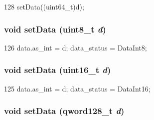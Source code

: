 \begin{DoxyCode}
128 { setData((uint64_t)d); }
\end{DoxyCode}
\hypertarget{classTrace_1_1InstRecord_aa51cc6b27f5c0f81c58f5735506cd5a7}{
\subsubsection[{setData}]{\setlength{\rightskip}{0pt plus 5cm}void setData (uint8\_\-t {\em d})}}
\label{classTrace_1_1InstRecord_aa51cc6b27f5c0f81c58f5735506cd5a7}



\begin{DoxyCode}
126 { data.as_int = d; data_status = DataInt8; }
\end{DoxyCode}
\hypertarget{classTrace_1_1InstRecord_a5166a73856a875b0e426fdc95212937c}{
\subsubsection[{setData}]{\setlength{\rightskip}{0pt plus 5cm}void setData (uint16\_\-t {\em d})}}
\label{classTrace_1_1InstRecord_a5166a73856a875b0e426fdc95212937c}



\begin{DoxyCode}
125 { data.as_int = d; data_status = DataInt16; }
\end{DoxyCode}
\hypertarget{classTrace_1_1InstRecord_ad815e14bea9095c2c12c659fe3db13f3}{
\subsubsection[{setData}]{\setlength{\rightskip}{0pt plus 5cm}void setData ({\bf qword128\_\-t} {\em d})}}
\label{classTrace_1_1InstRecord_ad815e14bea9095c2c12c659fe3db13f3}



